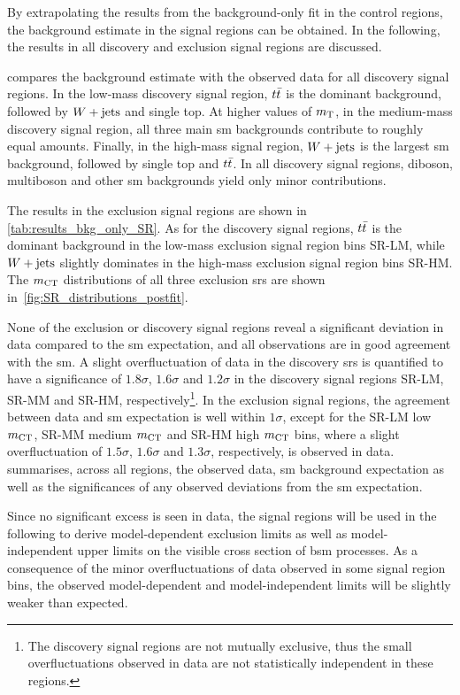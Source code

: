 By extrapolating the results from the background-only fit in the control regions, the background estimate in the signal regions can be obtained. In the following, the results in all discovery and exclusion signal regions are discussed.

 compares the background estimate with the observed data for all discovery signal regions. In the low-mass discovery signal region, $t\bar{t}$ is the dominant background, followed by $W+\mathrm{jets}$ and single top. At higher values of $m_{\textrm{T}}$, \ie in the medium-mass discovery signal region, all three main \gls{sm} backgrounds contribute to roughly equal amounts. Finally, in the high-mass signal region, $W+\mathrm{jets}$ is the largest \gls{sm} background, followed by single top and $t\bar{t}$. In all discovery signal regions, diboson, multiboson and other \gls{sm} backgrounds yield only minor contributions. 

The results in the exclusion signal regions are shown in \cref{tab:results_bkg_only_SR}. As for the discovery signal regions, $t\bar{t}$ is the dominant background in the low-mass exclusion signal region bins SR-LM, while $W+\mathrm{jets}$ slightly dominates in the high-mass exclusion signal region bins SR-HM. The $m_{\textrm{CT}}$ distributions of all three exclusion \glspl{sr} are shown in~\cref{fig:SR_distributions_postfit}.

None of the exclusion or discovery signal regions reveal a significant deviation in data compared to the \gls{sm} expectation, and all observations are in good agreement with the \gls{sm}. A slight overfluctuation of data in the discovery \glspl{sr} is quantified to have a significance of $1.8\sigma$, $1.6\sigma$ and $1.2\sigma$ in the discovery signal regions SR-LM, SR-MM and SR-HM, respectively\footnote{The discovery signal regions are not mutually exclusive, thus the small overfluctuations observed in data are not statistically independent in these regions.}. In the exclusion signal regions, the agreement between data and \gls{sm} expectation is well within $1\sigma$, except for the SR-LM low $m_{\textrm{CT}}$, SR-MM medium $m_{\textrm{CT}}$ and SR-HM high $m_{\textrm{CT}}$ bins, where a slight overfluctuation of $1.5\sigma$, $1.6\sigma$ and $1.3\sigma$, respectively, is observed in data.  summarises, across all regions, the observed data, \gls{sm} background expectation as well as the significances of any observed deviations from the \gls{sm} expectation.

Since no significant excess is seen in data, the signal regions will be used in the following to derive model-dependent exclusion limits as well as model-independent upper limits on the visible cross section of \gls{bsm} processes. As a consequence of the minor overfluctuations of data observed in some signal region bins, the observed model-dependent and model-independent limits will be slightly weaker than expected. 

